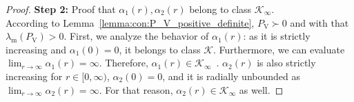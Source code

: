 \begin{proof}
    \textbf{Step 2:} Proof that $\alpha_1(r), \alpha_2(r)$ belong to class $\mathcal{K}_\infty$.\\
    According to Lemma~\ref{lemma:con:P_V_positive_definite}, $P_\mathrm{V} \succ 0$ and with that $\lambda_\mathrm{m}(P_\mathrm{V}) > 0$.
    First, we analyze the behavior of $\alpha_1(r)$: as it is strictly increasing and $\alpha_1(0) = 0$, it belongs to class $\mathcal{K}$. Furthermore, we can evaluate $\lim_{r \rightarrow \infty} \alpha_1(r) = \infty$. Therefore, $\alpha_1(r) \in \mathcal{K}_\infty$~\citep{khalil2002nonlinear}.
    $\alpha_2(r)$ is also strictly increasing for $r \in [0, \infty)$, $\alpha_2(0) = 0$, and it is radially unbounded as $\lim_{r \rightarrow \infty} \alpha_2(r) = \infty$. For that reason, $\alpha_2(r) \in \mathcal{K}_\infty$ as well.
\end{proof}

